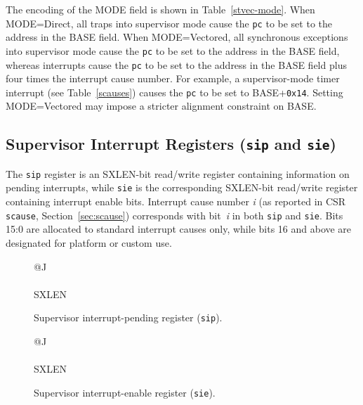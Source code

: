 The encoding of the MODE field is shown in Table~\ref{stvec-mode}.  When
MODE=Direct, all traps into supervisor mode cause the {\tt pc} to be set to the
address in the BASE field.  When MODE=Vectored, all synchronous exceptions
into supervisor mode cause the {\tt pc} to be set to the address in the BASE
field, whereas interrupts cause the {\tt pc} to be set to the address in
the BASE field plus four times the interrupt cause number.  For example,
a supervisor-mode timer interrupt (see Table~\ref{scauses}) causes the {\tt pc}
to be set to BASE+{\tt 0x14}.
Setting MODE=Vectored may impose a stricter alignment constraint on BASE.

\subsection{Supervisor Interrupt Registers ({\tt sip} and {\tt sie})}

The {\tt sip} register is an SXLEN-bit read/write register containing
information on pending interrupts, while {\tt sie} is the corresponding
SXLEN-bit read/write register containing interrupt enable bits.
Interrupt cause number \textit{i} (as reported in CSR {\tt scause},
Section~\ref{sec:scause}) corresponds with bit~\textit{i} in both
{\tt sip} and {\tt sie}.
Bits 15:0 are allocated to standard interrupt causes only, while bits 16
and above are designated for platform or custom use.

\begin{figure}[h!]
{\footnotesize
\begin{center}
\begin{tabular}{@{}J}
 \\
\hline
{} \\
\hline
SXLEN \\
\end{tabular}
\end{center}
}
\vspace{-0.1in}
\caption{Supervisor interrupt-pending register ({\tt sip}).}
\label{sipreg}
\end{figure}

\begin{figure}[h!]
{\footnotesize
\begin{center}
\begin{tabular}{@{}J}
 \\
\hline
{} \\
\hline
SXLEN \\
\end{tabular}
\end{center}
}
\vspace{-0.1in}
\caption{Supervisor interrupt-enable register ({\tt sie}).}
\label{siereg}
\end{figure}

